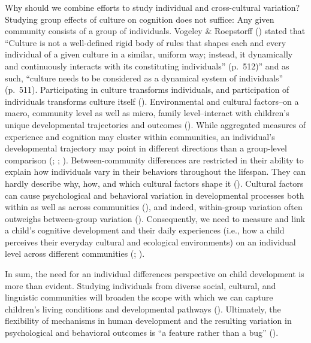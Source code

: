 \documentclass[
]{scrbook}
\begin{document}
Why should we combine efforts to study individual and cross-cultural variation? Studying group effects of culture on cognition does not suffice: Any given community consists of a group of individuals. Vogeley \& Roepstorff () stated that ``Culture is not a well-defined rigid body of rules that shapes each and every individual of a given culture in a similar, uniform way; instead, it dynamically and continuously interacts with its constituting individuals'' (p.~512)'' and as such, ``culture needs to be considered as a dynamical system of individuals'' (p.~511). Participating in culture transforms individuals, and participation of individuals transforms culture itself (). Environmental and cultural factors\thinspace --\thinspace on a macro, community level as well as micro, family level\thinspace --\thinspace interact with children's unique developmental trajectories and outcomes (). While aggregated measures of experience and cognition may cluster within communities, an individual's developmental trajectory may point in different directions than a group-level comparison (; ; ). Between-community differences are restricted in their ability to explain how individuals vary in their behaviors throughout the lifespan. They can hardly describe why, how, and which cultural factors shape it (). Cultural factors can cause psychological and behavioral variation in developmental processes both within as well as across communities (), and indeed, within-group variation often outweighs between-group variation (). Consequently, we need to measure and link a child's cognitive development and their daily experiences (i.e., how a child perceives their everyday cultural and ecological environments) on an individual level across different communities (; ).

In sum, the need for an individual differences perspective on child development is more than evident. Studying individuals from diverse social, cultural, and linguistic communities will broaden the scope with which we can capture children's living conditions and developmental pathways (). Ultimately, the flexibility of mechanisms in human development and the resulting variation in psychological and behavioral outcomes is ``a feature rather than a bug'' ().
\end{document}
